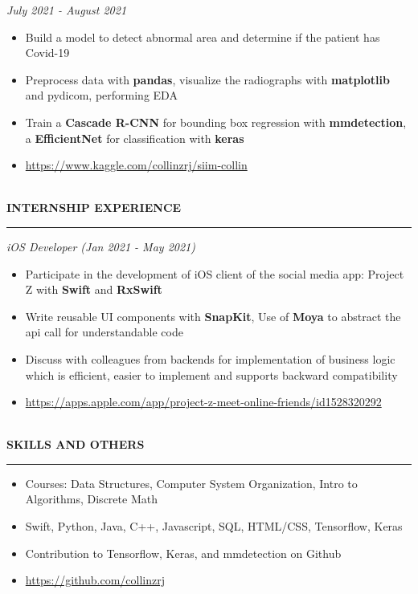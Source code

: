 \documentclass{article}
\begin{document}
\emph{July 2021 - August 2021}
\begin{itemize}[leftmargin=*,topsep=0pt]
\item Build a model to detect abnormal area and determine if the patient has Covid-19
\item Preprocess data with \textbf{pandas}, visualize the radiographs with \textbf{matplotlib} and pydicom, performing EDA
\item Train a \textbf{Cascade R-CNN} for bounding box regression with \textbf{mmdetection}, a \textbf{EfficientNet} for classification with \textbf{keras}
\item \url{https://www.kaggle.com/collinzrj/siim-collin}

\end{itemize} \ \\ 
\noindent
{\textbf{INTERNSHIP EXPERIENCE}}\newline
\rule{\textwidth}{1pt}\newline
\emph{iOS Developer (Jan 2021 - May 2021)}
\begin{itemize}[leftmargin=*,topsep=0pt]
\item Participate in the development of iOS client of the social media app: Project Z with \textbf{Swift} and \textbf{RxSwift}
\item Write reusable UI components with \textbf{SnapKit}, Use of \textbf{Moya} to abstract the api call for understandable code
\item Discuss with colleagues from backends for implementation of business logic which is efficient, easier to implement and supports backward compatibility
\item \url{https://apps.apple.com/app/project-z-meet-online-friends/id1528320292}

\end{itemize} \ \\ 
\noindent
{\textbf{SKILLS AND OTHERS}}\newline
\rule{\textwidth}{1pt}\begin{itemize}[leftmargin=*,topsep=0pt]
\item Courses: Data Structures, Computer System Organization, Intro to Algorithms, Discrete Math
\item Swift, Python, Java, C++, Javascript, SQL, HTML/CSS, Tensorflow, Keras
\item Contribution to Tensorflow, Keras, and mmdetection on Github
\item \url{https://github.com/collinzrj}

\end{itemize} \ \\ 
\end{document}
